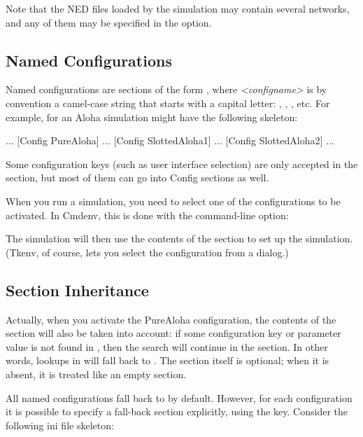 Note that the NED files loaded by the simulation may contain several
networks, and any of them may be specified in the 
option.


\subsection{Named Configurations}

Named configurations are sections of the form , where
\textit{<configname>} is by convention a camel-case string that starts with a capital letter:
, , , etc. For example,
 for an Aloha simulation might have the following skeleton:

\begin{inifile}
[General]
...
[Config PureAloha]
...
[Config SlottedAloha1]
...
[Config SlottedAloha2]
...
\end{inifile}

Some configuration keys (such as user interface selection) are only
accepted in the \ttt{[General]} section, but most of them can go into Config
sections as well.

When you run a simulation, you need to select one of the configurations
to be activated. In Cmdenv, this is done with the  command-line option:


The simulation will then use the contents of the 
section to set up the simulation. (Tkenv, of course, lets you select
the configuration from a dialog.)


\subsection{Section Inheritance}

Actually, when you activate the PureAloha configuration, the contents of
the \ttt{[General]} section will also be taken into account: if some
configuration key or parameter value is not found in ,
then the search will continue in the \ttt{[General]} section. In
other words, lookups in  will fall back to \ttt{[General]}.
The \ttt{[General]} section itself is optional; when it is absent, it is
treated like an empty \ttt{[General]} section.

All named configurations fall back to \ttt{[General]} by default. However, for
each configuration it is possible to specify a fall-back section
explicitly, using the  key. Consider the following ini file
skeleton:

